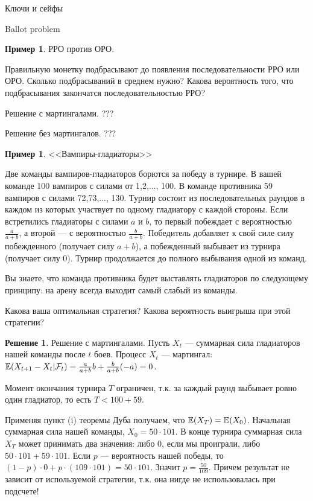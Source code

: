 \documentclass[pdftex,12pt,a4paper]{article}
\numberwithin{equation}{page} %
\theoremstyle{definition} %
\theoremstyle{definition}
\newtheorem{example}[equation]{Пример}
\theoremstyle{definition}
\newtheorem*{solution}{Решение}
\theoremstyle{definition}
\begin{document}
Ключи и сейфы \cite{aops:keys} %

Ballot problem \cite{ross:scp} %




\begin{example} 
РРО против ОРО\cite{li:ma}. %

Правильную монетку подбрасывают до появления последовательности РРО или ОРО. Сколько подбрасываний в среднем нужно? Какова вероятность того, что подбрасывания закончатся последовательностью РРО?
\end{example}

Решение с мартингалами. ???

Решение без мартингалов. ???



\begin{example}  <<Вампиры-гладиаторы>> \cite{winkler:gpdp} %

Две команды вампиров-гладиаторов борются за победу в турнире. В вашей команде 100 вампиров с силами от 1,2,..., 100. В команде противника 59 вампиров с силами 72,73,..., 130. Турнир состоит из последовательных раундов в каждом из которых участвует по одному гладиатору с каждой стороны. Если встретились гладиаторы с силами $a$ и $b$, то первый побеждает с вероятностью $\frac{a}{a+b}$, а второй --- с вероятностью $\frac{b}{a+b}$. Победитель добавляет к свой силе силу побежденного (получает силу $a+b$), а побежденный выбывает из турнира (получает силу $0$). Турнир продолжается до полного выбывания одной из команд.

Вы знаете, что команда противника будет выставлять гладиаторов по следующему принципу: на арену всегда выходит самый слабый из команды.

Какова ваша оптимальная стратегия? Какова вероятность выигрыша при этой стратегии?
\end{example}

\begin{solution}
Решение с мартингалами. Пусть $X_{t}$ --- суммарная сила гладиаторов нашей команды после $t$ боев. Процесс $X_{t}$ --- мартингал: $\mathbb{E}(X_{t+1}-X_{t}|\mathcal{F}_{t})=\frac{a}{a+b}b+\frac{b}{a+b}(-a)=0$.

Момент окончания турнира $T$ ограничен, т.к. за каждый раунд выбывает ровно один гладиатор, то есть $T<100+59$.

Применяя пункт (i) теоремы Дуба получаем, что $\mathbb{E}(X_{T})=\mathbb{E}(X_{0})$. Начальная суммарная сила нашей команды, $X_{0}=50\cdot 101$. В конце турнира суммарная сила $X_{T}$ может принимать два значения: либо 0, если мы проиграли, либо $50\cdot 101+59\cdot 101$. Если $p$ --- вероятность нашей победы, то $(1-p)\cdot 0+p\cdot (109\cdot 101)=50\cdot 101$. Значит $p=\frac{50}{109}$. Причем результат не зависит от используемой стратегии, т.к. она нигде не использовалась при подсчете!
\end{solution}
\end{document}
